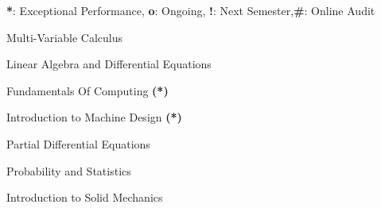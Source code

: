 
\begin{cventries}

  \cventry
    {\textbf{*}: Exceptional Performance,  \textbf{o}: Ongoing,   \textbf{!}: Next Semester,\textbf{\#}: Online Audit}{}{}{}{\begin{cvitems}
        \item {Multi-Variable Calculus}
        \item {Linear Algebra and Differential Equations}
        \item {Fundamentals Of Computing \textbf{(*)}}
        \item {Introduction to Machine Design \textbf{(*)}} 
        \item {Partial Differential Equations}
        \item {Probability and Statistics}
        \item {Introduction to Solid Mechanics}
      \end{cvitems}
      }
  \end{cventries}
